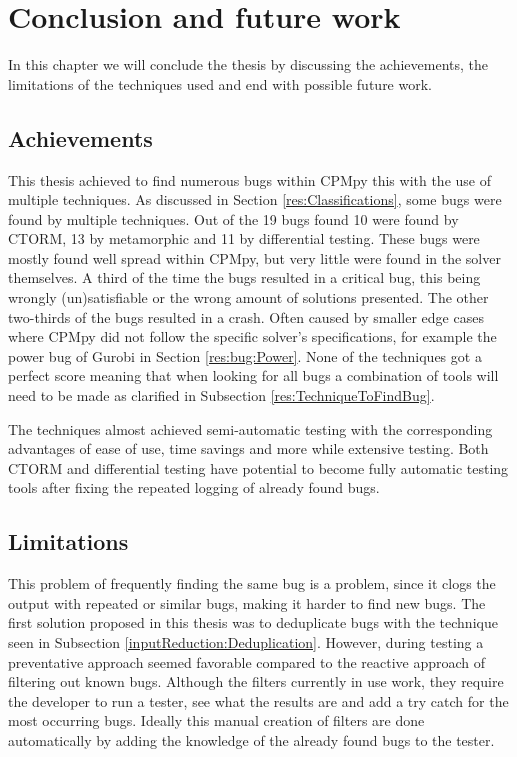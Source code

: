 \chapter{Conclusion and future work}
\label{cha:7:conclusion}
\label{con:intro}
In this chapter we will conclude the thesis by discussing the achievements, the limitations of the techniques used and end with possible future work.

\section{Achievements}
\label{con:Achievements}
This thesis achieved to find numerous bugs within CPMpy this with the use of multiple techniques. As discussed in Section \ref{res:Classifications}, some bugs were found by multiple techniques. Out of the 19 bugs found 10 were found by CTORM, 13 by metamorphic and 11 by differential testing. These bugs were mostly found well spread within CPMpy, but very little were found in the solver themselves. A third of the time the bugs resulted in a critical bug, this being wrongly (un)satisfiable or the wrong amount of solutions presented. The other two-thirds of the bugs resulted in a crash. Often caused by smaller edge cases where CPMpy did not follow the specific solver’s specifications, for example the power bug of Gurobi in Section \ref{res:bug:Power}. None of the techniques got a perfect score meaning that when looking for all bugs a combination of tools will need to be made as clarified in Subsection \ref{res:TechniqueToFindBug}.

The techniques almost achieved semi-automatic testing with the corresponding advantages of ease of use, time savings and more while extensive testing. Both CTORM and differential testing have potential to become fully automatic testing tools after fixing the repeated logging of already found bugs.


\section{Limitations}
\label{con:Limitations}
This problem of frequently finding the same bug is a problem, since it clogs the output with repeated or similar bugs, making it harder to find new bugs. The first solution proposed in this thesis was to deduplicate bugs with the technique seen in Subsection \ref{inputReduction:Deduplication}. However, during testing a preventative approach seemed  favorable compared to the reactive approach of filtering out known bugs. Although the filters currently in use work, they require the developer to run a tester, see what the results are and add a try catch for the most occurring bugs. Ideally this manual creation of filters are done automatically by adding the knowledge of the already found bugs to the tester. 

